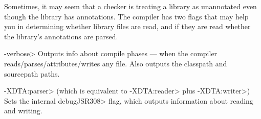 Sometimes, it may seem that a checker is treating a library as unannotated
even though the library has annotations.  The compiler has two flags that
may help you in determining whether library files are read, and if they are
read whether the library's annotations are parsed.

\begin{description}
\item \<-verbose>
  Outputs info about compile phases --- when the compiler
  reads/parses/attributes/writes any file.  Also outputs the classpath and
  sourcepath paths.
\item \<-XDTA:parser> (which is equivalent to \<-XDTA:reader> plus \<-XDTA:writer>)
  Sets the internal \<debugJSR308> flag, which outputs information about
  reading and writing.
\end{description}


